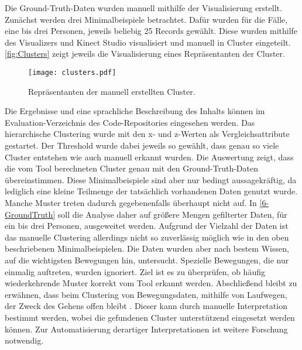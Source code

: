 Die Ground-Truth-Daten wurden manuell mithilfe der Visualisierung erstellt.
Zunächst werden drei Minimalbeispiele betrachtet.
Dafür wurden für die Fälle, eine bis drei Personen, jeweils beliebig 25 Records gewählt.
Diese wurden mithilfe des Visualizers und Kinect Studio visualisiert und manuell in Cluster eingeteilt.
\autoref{fig:Clusters} zeigt jeweils die Visualisierung eines Repräsentanten der Cluster.
\begin{figure}[ht]
    \begin{center}
    \texttt{[image: clusters.pdf]}
    \end{center}
    \caption{Repräsentanten der manuell erstellten Cluster.}
    \label{fig:Clusters}
\end{figure}
Die Ergebnisse und eine sprachliche Beschreibung des Inhalts
können im Evaluation-Verzeichnis des Code-Repositories eingesehen werden.
Das hierarchische Clustering wurde mit den x- und z-Werten als Vergleichsattribute gestartet.
Der Threshold wurde dabei jeweils so gewählt,
dass genau so viele Cluster entstehen wie auch manuell erkannt wurden.
Die Auswertung zeigt, dass die vom Tool berechneten Cluster genau mit den Ground-Truth-Daten übereinstimmen.
Diese Minimalbeispiele sind aber nur bedingt aussagekräftig,
da lediglich eine kleine Teilmenge der tatsächlich vorhandenen Daten genutzt wurde.
Manche Muster treten dadurch gegebenenfalls überhaupt nicht auf.
In \autoref{6-GroundTruth} soll die Analyse daher auf größere Mengen gefilterter Daten,
für ein bis drei Personen, ausgeweitet werden.
Aufgrund der Vielzahl der Daten ist das manuelle Clustering allerdings nicht so
zuverlässig möglich wie in den oben beschriebenen Minimalbeispielen.
Die Daten wurden aber nach bestem Wissen, auf die wichtigsten Bewegungen hin, untersucht.
Spezielle Bewegungen, die nur einmalig auftreten, wurden ignoriert.
Ziel ist es zu überprüfen,
ob häufig wiederkehrende Muster korrekt vom Tool erkannt werden.
Abschließend bleibt zu erwähnen,
dass beim Clustering von Bewegungsdaten, mithilfe von Laufwegen,
der Zweck des Gehens offen bleibt \citep{monastero_traces_2018}.
Dieser kann durch manuelle Interpretation bestimmt werden,
wobei die gefundenen Cluster unterstützend eingesetzt werden können.
Zur Automatisierung derartiger Interpretationen ist weitere Forschung notwendig.

